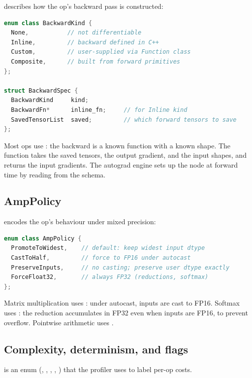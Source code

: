  describes how the op's backward pass is
constructed:

\begin{lstlisting}[style=lucidcpp,language=C++]
enum class BackwardKind {
  None,           // not differentiable
  Inline,         // backward defined in C++
  Custom,         // user-supplied via Function class
  Composite,      // built from forward primitives
};

struct BackwardSpec {
  BackwardKind     kind;
  BackwardFn*      inline_fn;     // for Inline kind
  SavedTensorList  saved;         // which forward tensors to save
};
\end{lstlisting}

Most ops use : the backward is a known function with
a known shape. The function takes the saved tensors, the output
gradient, and the input shapes, and returns the input gradients.
The autograd engine sets up the  node at forward
time by reading  from the schema.

\subsection{AmpPolicy}
\label{ssec:op_registry:amp}

 encodes the op's behaviour under mixed precision:

\begin{lstlisting}[style=lucidcpp,language=C++]
enum class AmpPolicy {
  PromoteToWidest,    // default: keep widest input dtype
  CastToHalf,         // force to FP16 under autocast
  PreserveInputs,     // no casting; preserve user dtype exactly
  ForceFloat32,       // always FP32 (reductions, softmax)
};
\end{lstlisting}

Matrix multiplication uses : under autocast,
 inputs are cast to FP16. Softmax uses
: the reduction accumulates in FP32 even when
inputs are FP16, to prevent overflow. Pointwise arithmetic uses
.

\subsection{Complexity, determinism, and flags}
\label{ssec:op_registry:misc}

 is an enum
(, , , , ) that
the profiler uses to label per-op costs.

